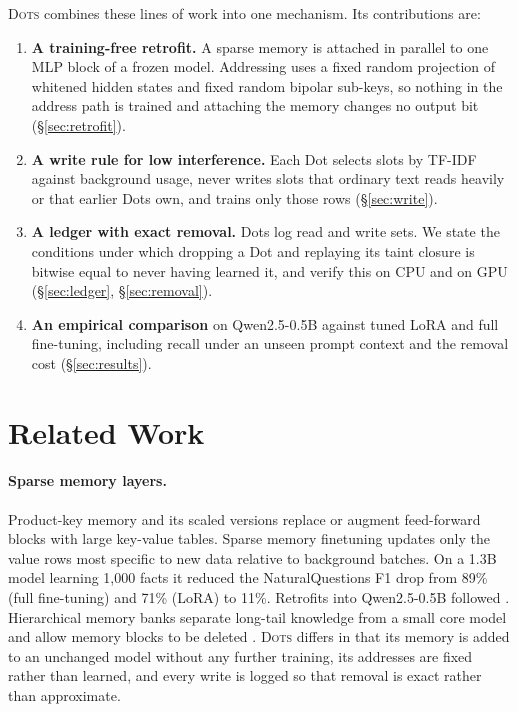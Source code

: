 \documentclass[10pt]{article}
\newcommand{\sys}{\textsc{Dots}}
\begin{document}
\sys{} combines these lines of work into one mechanism. Its contributions are:

\begin{enumerate}
  \item \textbf{A training-free retrofit.} A sparse memory is attached in parallel to one MLP block of a frozen model. Addressing uses a fixed random projection of whitened hidden states and fixed random bipolar sub-keys, so nothing in the address path is trained and attaching the memory changes no output bit (\S\ref{sec:retrofit}).
  \item \textbf{A write rule for low interference.} Each Dot selects slots by TF-IDF against background usage, never writes slots that ordinary text reads heavily or that earlier Dots own, and trains only those rows (\S\ref{sec:write}).
  \item \textbf{A ledger with exact removal.} Dots log read and write sets. We state the conditions under which dropping a Dot and replaying its taint closure is bitwise equal to never having learned it, and verify this on CPU and on GPU (\S\ref{sec:ledger}, \S\ref{sec:removal}).
  \item \textbf{An empirical comparison} on Qwen2.5-0.5B against tuned LoRA and full fine-tuning, including recall under an unseen prompt context and the removal cost (\S\ref{sec:results}).
\end{enumerate}

\section{Related Work}

\paragraph{Sparse memory layers.} Product-key memory \citep{lample2019pkm} and its scaled versions \citep{berges2024memory} replace or augment feed-forward blocks with large key-value tables. Sparse memory finetuning \citep{lin2025smf} updates only the value rows most specific to new data relative to background batches. On a 1.3B model learning 1{,}000 facts it reduced the NaturalQuestions F1 drop from 89\% (full fine-tuning) and 71\% (LoRA) to 11\%. Retrofits into Qwen2.5-0.5B followed \citep{goyal2026improving,gupta2026smf}. Hierarchical memory banks separate long-tail knowledge from a small core model and allow memory blocks to be deleted \citep{pouransari2026hier}. \sys{} differs in that its memory is added to an unchanged model without any further training, its addresses are fixed rather than learned, and every write is logged so that removal is exact rather than approximate.
\end{document}
